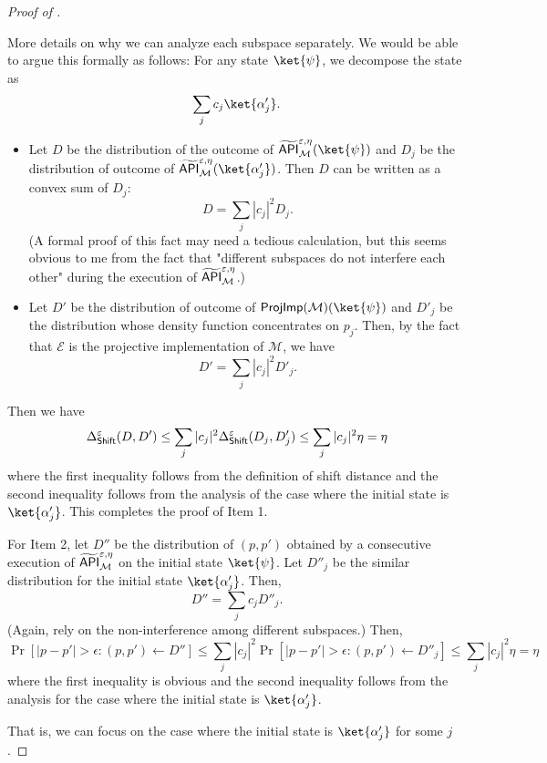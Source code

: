 \begin{proof}[Proof of ]
\begin{takashienv}{More details on why we can analyze each subspace separately.}
 We would be able to argue this formally as follows:
For any state $\ket{\psi}$, we decompose the state as
\[
\sum_{j} c_j \ket{\alpha'_j}.
\]
\begin{itemize}
\item Let $D$ be the distribution of the outcome of $\tilde{\API}_{\mcal{M}}^{\epsilon,\eta}(\ket{\psi})$ and $D_j$ be the distribution of outcome of $\tilde{\API}_{\mcal{M}}^{\epsilon,\eta}(\ket{\alpha'_j})$. 
Then $D$ can be written as a convex sum of $D_j$:
\[
D=\sum_{j} |c_j|^2 D_j.
\]
(A formal proof of this fact may need a tedious calculation, but this seems obvious to me from the fact that "different subspaces do not interfere each other" during the execution of $\widetilde{\mathsf{API}}_{\mathcal{M}}^{\varepsilon,\eta}$.)
\item Let $D'$ be the distribution of outcome of $\mathsf{ProjImp}(\mathcal{M})(\ket{\psi})$ and $D'_j$ be the distribution whose density function concentrates on $p_j$. Then, by the fact that $\mathcal{E}$ is the projective implementation of $\mathcal{M}$,  we have 
\[
D'=\sum_{j} |c_j|^2 D'_j.
\]
\end{itemize}
Then we have 
\[
\Delta_{\mathsf{Shift}}^{\varepsilon}(D,D')\le
\sum_{j}|c_j|^2\Delta_{\mathsf{Shift}}^{\varepsilon}(D_j,D'_j)
\le 
\sum_{j}|c_j|^2 \eta =\eta
\]
where the first inequality follows from the definition of shift distance and the second inequality follows from the analysis of the case where the initial state is $\ket{\alpha'_j}$.  
This completes the proof of Item 1. 

For Item 2, let $D''$ be the distribution of $(p,p')$ obtained by a consecutive execution of $\widetilde{\mathsf{API}}_{\mathcal{M}}^{\varepsilon,\eta}$ on the initial state $\ket{\psi}$. 
Let $D''_j$ be the similar distribution for the initial state $\ket{\alpha'_j}$. 
Then, 
\[
D''=\sum_{j}c_j D''_j.
\]
(Again, rely on the non-interference among different subspaces.)
Then, 
\[
\Pr[|p-p'|> \epsilon:(p,p')\leftarrow D'']
\le 
\sum_{j}|c_j|^2\Pr[|p-p'|> \epsilon:(p,p')\leftarrow D''_j]
\le 
\sum_{j}|c_j|^2 \eta =\eta
\]
where the first inequality is obvious and the second inequality follows from the analysis for the case where the initial state is $\ket{\alpha'_j}$.  
\end{takashienv}
That is, we can focus on the case where the initial state is $\ket{\alpha'_j}$ for some $j$. 


\end{proof}
